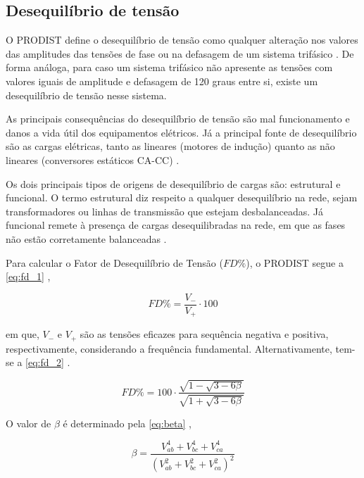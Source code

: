 \subsection{Desequilíbrio de tensão}

O PRODIST define o desequilíbrio de tensão como qualquer alteração nos valores das amplitudes das tensões de fase ou na defasagem de um sistema trifásico \cite{ref:ANEEL2021}. De forma análoga, para  caso um sistema trifásico não apresente as tensões com valores iguais de amplitude e defasagem de 120 graus entre si, existe um desequilíbrio de tensão nesse sistema.

As principais consequências do desequilíbrio de tensão são mal funcionamento e danos a vida útil dos equipamentos elétricos. Já a principal fonte de desequilíbrio são as cargas elétricas, tanto as lineares (motores de indução) quanto as não lineares (conversores estáticos CA-CC) \cite{ref:paulilo_2013}.

Os dois principais tipos de origens de desequilíbrio de cargas são: estrutural e funcional. O termo estrutural diz respeito a qualquer desequilíbrio na rede, sejam transformadores ou linhas de transmissão que estejam desbalanceadas. Já funcional remete à presença de cargas desequilibradas na rede, em que as fases não estão corretamente balanceadas \cite{ref:rezende_2012}.

Para calcular o Fator de Desequilíbrio de Tensão ($FD\%$), o PRODIST segue a \autoref{eq:fd_1} \cite{ref:ANEEL2021},

\begin{equation}
  FD\% = \frac{V_-}{V_+}\cdot 100
  \label{eq:fd_1}
\end{equation}

\noindent
em que, $V_-$ e $V_+$ são as tensões eficazes para sequência negativa e positiva, respectivamente, considerando a frequência fundamental. Alternativamente, tem-se a \autoref{eq:fd_2} \cite{ref:ANEEL2021}.

\begin{equation}
  FD\%=100 \cdot \frac{\sqrt{1-\sqrt{3-6 \beta}}}{\sqrt{1+\sqrt{3-6 \beta}}}
  \label{eq:fd_2}
\end{equation}

O valor de $\beta$ é determinado pela \autoref{eq:beta} \cite{ref:ANEEL2021},

\begin{equation}  
  \beta=\frac{V_{a b}^4+V_{b c}^4+V_{c a}^4}{\left(V_{a b}^2+V_{b c}^2+V_{c a}^2\right)^2}
  \label{eq:beta}
\end{equation}

